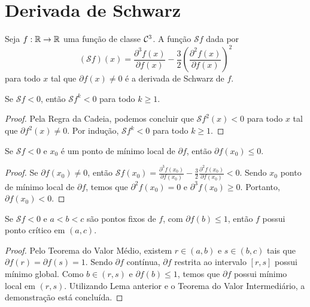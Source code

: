 \section{Derivada de Schwarz}

\begin{definition}
Seja $f: \mathbb{R} \to \mathbb{R}$ uma função de classe $\mathcal{C}^3$. A função $\mathcal{S}f$ dada por
$$(\mathcal{S}f)(x) = \frac{\partial^3 f(x)}{\partial f(x)} - \frac{3}{2} \left( \frac{\partial^2 f(x)}{\partial f(x)} \right)^2$$
para todo $x$ tal que $\partial f(x) \neq 0$ é a derivada de Schwarz de $f$.
\end{definition}

\begin{lemma}
Se $\mathcal{S}f < 0$, então $\mathcal{S}f^k < 0$ para todo $k \geq 1$.
\end{lemma}

\begin{proof}
Pela Regra da Cadeia, podemos concluir que $\mathcal{S}f^2(x) < 0$ para todo $x$ tal que $\partial f^2(x) \neq 0$. Por indução, $\mathcal{S}f^k < 0$ para todo $k \geq 1$.
\end{proof}

\begin{lemma}
\label{lemma1}
Se $\mathcal{S}f < 0$ e $x_0$ é um ponto de mínimo local de $\partial f$, então $\partial f(x_0) \leq 0$.
\end{lemma}

\begin{proof}
Se $\partial f(x_0) \neq 0$, então $\mathcal{S}f(x_0) = \frac{\partial^3 f(x_0)}{\partial f(x_0)} - \frac{3}{2} \frac{\partial^2 f(x_0)}{\partial f(x_0)} < 0$. Sendo $x_0$ ponto de mínimo local de $\partial f$, temos que $\partial^2 f(x_0) = 0$ e $\partial^3 f(x_0) \geq 0$. Portanto,  $\partial f(x_0) < 0$. 
\end{proof}

\begin{lemma}
\label{lemma2}
Se $\mathcal{S}f < 0$ e $a<b<c$ são pontos fixos de $f$, com $\partial f(b) \leq 1$, então $f$ possui ponto crítico em $(a, c)$.
\end{lemma}

\begin{proof}
Pelo Teorema do Valor Médio, existem $r \in (a,b)$ e $s \in (b,c)$  tais que $\partial f(r) = \partial f(s) = 1$. Sendo $\partial f$ contínua, $\partial f$ restrita ao intervalo $[r,s]$ possui mínimo global. Como $b \in (r,s)$ e $\partial f(b) \leq 1$, temos que $\partial f$ possui mínimo local em $(r,s)$. Utilizando Lema anterior e o Teorema do Valor Intermediário, a demonstração está concluída.
\end{proof}

